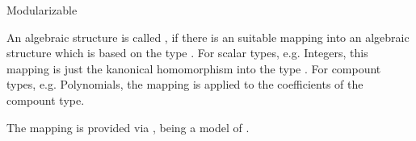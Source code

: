 \begin{ccRefConcept}{Modularizable}

\ccDefinition

An algebraic structure is called \ccRefName, if there is an suitable mapping 
into an algebraic structure which is based on the type . 
For scalar types, e.g. Integers, this mapping is just the kanonical homomorphism 
into the type . For compount types, e.g. Polynomials, 
the mapping is applied to the coefficients of the compount type. 

The mapping is provided via , 
being a model of .

\ccSeeAlso
{}\\
\\

\end{ccRefConcept}